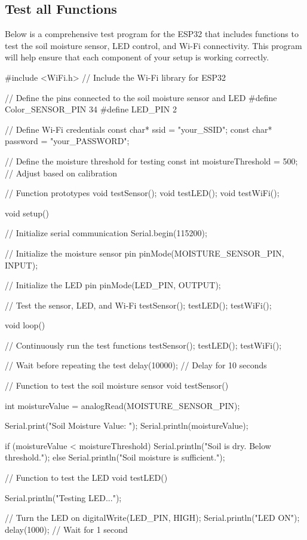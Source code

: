 \subsection{Test all Functions}

Below is a comprehensive test program for the ESP32 that includes functions to test the soil moisture sensor, LED control, and Wi-Fi connectivity. This program will help ensure that each component of your setup is working correctly.

\begin{Arduino}
	#include <WiFi.h>  // Include the Wi-Fi library for ESP32
	
	// Define the pins connected to the soil moisture sensor and LED
	#define Color_SENSOR_PIN 34
	#define LED_PIN 2
	
	// Define Wi-Fi credentials
	const char* ssid = "your_SSID";
	const char* password = "your_PASSWORD";
	
	// Define the moisture threshold for testing
	const int moistureThreshold = 500; // Adjust based on calibration
	
	// Function prototypes
	void testSensor();
	void testLED();
	void testWiFi();
	
	void setup() {
		// Initialize serial communication
		Serial.begin(115200);
		
		// Initialize the moisture sensor pin
		pinMode(MOISTURE_SENSOR_PIN, INPUT);
		
		// Initialize the LED pin
		pinMode(LED_PIN, OUTPUT);
		
		// Test the sensor, LED, and Wi-Fi
		testSensor();
		testLED();
		testWiFi();
	}
	
	void loop() {
		// Continuously run the test functions
		testSensor();
		testLED();
		testWiFi();
		
		// Wait before repeating the test
		delay(10000); // Delay for 10 seconds
	}
	
	// Function to test the soil moisture sensor
	void testSensor() {
		int moistureValue = analogRead(MOISTURE_SENSOR_PIN);
		
		Serial.print("Soil Moisture Value: ");
		Serial.println(moistureValue);
		
		if (moistureValue < moistureThreshold) {
			Serial.println("Soil is dry. Below threshold.");
		} else {
			Serial.println("Soil moisture is sufficient.");
		}
	}
	
	// Function to test the LED
	void testLED() {
		Serial.println("Testing LED...");
		
		// Turn the LED on
		digitalWrite(LED_PIN, HIGH);
		Serial.println("LED ON");
		delay(1000); // Wait for 1 second
		
}
\end{Arduino}

